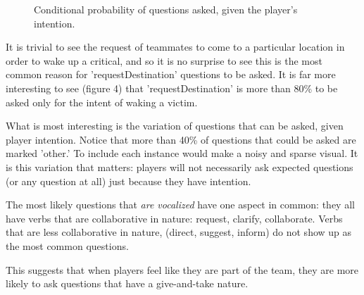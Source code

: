\documentclass[10pt]{article}
\begin{document}
\begin{figure}[h!]
    \centering
    \caption{Conditional probability of questions asked, given the player's intention.}
\end{figure}

It is trivial to see the request of teammates to come to a particular location in order to wake up a critical, and so it is no surprise to see this is the most common reason for 'requestDestination' questions to be asked. It is far more interesting to see (figure 4) that 'requestDestination' is more than 80\% to be asked only for the intent of waking a victim.

What is most interesting is the variation of questions that can be asked, given player intention. Notice that more than 40\% of questions that could be asked are marked 'other.' To include each instance would make a noisy and sparse visual. It is this variation that matters: players will not necessarily ask expected questions (or any question at all) just because they have intention. 

The most likely questions that \emph{are vocalized} have one aspect in common: they all have verbs that are collaborative in nature: request, clarify, collaborate. Verbs that are less collaborative in nature, (direct, suggest, inform) do not show up as the most common questions.

This suggests that when players feel like they are part of the team, they are more likely to ask questions that have a give-and-take nature.
\end{document}
